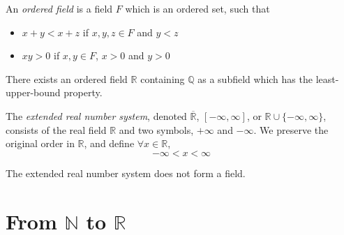 \documentclass{report}
\begin{document}
		\begin{defn} \label{def_ordered_field}
			An \emph{ordered field} is a field $F$ which is an ordered set, such that
			\begin{itemize}
				\item $x+y<x+z$ if $x,y,z \in F$ and $y<z$
				\item $xy>0$ if $x,y \in F$, $x>0$ and $y>0$
			\end{itemize}
			\end{defn}

		\begin{thm} \label{thm_existence_real_number}
			There exists an ordered field $\mathbb{R}$ containing $\mathbb{Q}$ as a subfield which has the least-upper-bound property.
		\end{thm}

		\begin{defn} \label{def_extended_real_number_system}
			The \emph{extended real number system}, denoted $\overline{\mathbb{R}}$, $[-\infty,\infty]$, or $\mathbb{R} \cup \{-\infty,\infty\}$, consists of the real field $\mathbb{R}$ and two symbols, $+\infty$ and $-\infty$. We preserve the original order in $\mathbb{R}$, and define $\forall x \in \mathbb{R}$,
			\begin{displaymath}
				-\infty<x<\infty
			\end{displaymath}
		\end{defn}

		\begin{remark} \label{remark_extended_real_number_system_not_field}
			The extended real number system does not form a field.
		\end{remark}

	\section{From $\mathbb{N}$ to $\mathbb{R}$}
\end{document}
